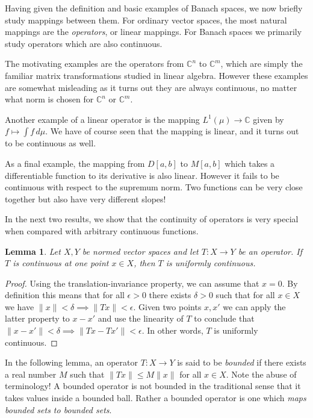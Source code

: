 \documentclass[11pt,oneside]{amsbook}
\newcommand{\CC}{{\mathbb C}}
\theoremstyle{definition}
\theoremstyle{plain}
\newtheorem{lem}[thm]{Lemma}
\theoremstyle{definition}
\theoremstyle{remark}
\numberwithin{equation}{section}
\numberwithin{figure}{section}
\begin{document}
Having given the definition and basic examples of Banach spaces, we now briefly study mappings between them. For ordinary vector spaces, the most natural mappings are the \emph{operators}, or linear mappings. For Banach spaces we primarily study operators which are also continuous.

The motivating examples are the operators from $\CC^n$ to $\CC^m$, which are simply the familiar matrix transformations studied in linear algebra. However these examples are somewhat misleading as it turns out they are always continuous, no matter what norm is chosen for $\CC^n$ or $\CC^m$.

Another example of a linear operator is the mapping $L^1(\mu)\to\CC$ given by $f\mapsto\int f\,d\mu$. We have of course seen that the mapping is linear, and it turns out to be continuous as well.

As a final example, the mapping from $D[a,b]$ to $M[a,b]$ which takes a differentiable function to its derivative is also linear. However it fails to be continuous with respect to the supremum norm. Two functions can be very close together but also have very different slopes!

In the next two results, we show that the continuity of operators is very special when compared with arbitrary continuous functions.

\begin{lem}
  Let $X,Y$ be normed vector spaces and let $T\colon X\to Y$ be an operator. If $T$ is continuous at one point $x\in X$, then $T$ is uniformly continuous.
\end{lem}

\begin{proof}
  Using the translation-invariance property, we can assume that $x=0$. By definition this means that for all $\epsilon>0$ there exists $\delta>0$ such that for all $x\in X$ we have $\|x\|<\delta\implies\|Tx\|<\epsilon$. Given two points $x,x'$ we can apply the latter property to $x-x'$ and use the linearity of $T$ to conclude that $\|x-x'\|<\delta\implies\|Tx-Tx'\|<\epsilon$. In other words, $T$ is uniformly continuous.
\end{proof}

In the following lemma, an operator $T\colon X\to Y$ is said to be \emph{bounded} if there exists a real number $M$ such that $\|Tx\|\leq M\|x\|$ for all $x\in X$. Note the abuse of terminology! A bounded operator is not bounded in the traditional sense that it takes values inside a bounded ball. Rather a bounded operator is one which \emph{maps bounded sets to bounded sets}.
\end{document}
